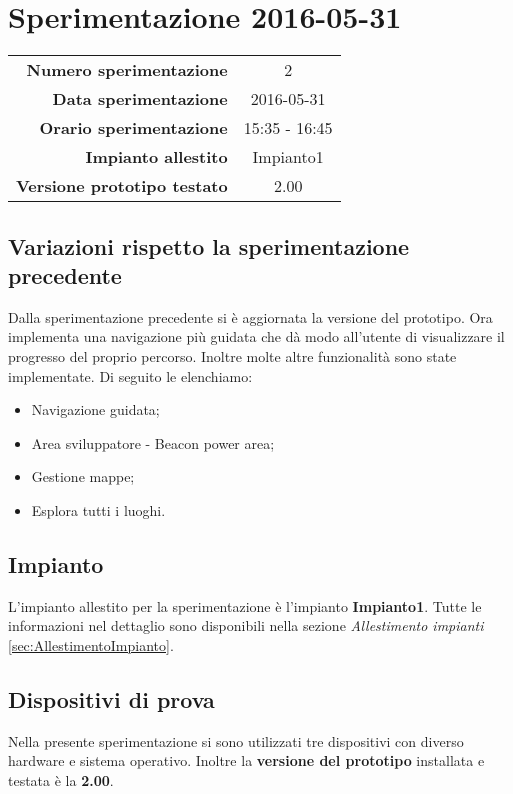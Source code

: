 \documentclass[../Sperimentazione.tex]{subfiles}
\begin{document}
	\section{Sperimentazione 2016-05-31}
	
		\begin{table} [h]
		\centering
		\begin{tabular}[width=0.5\textwidth]{r|c}
			\textbf{Numero sperimentazione} & 2 \\
			\textbf{Data sperimentazione} & 2016-05-31 \\
			\textbf{Orario sperimentazione} & 15:35 - 16:45 \\
			\textbf{Impianto allestito} & Impianto1 \\
			\textbf{Versione prototipo testato} & 2.00 \\		
		\end{tabular}
		\end{table}
		
		\subsection{Variazioni rispetto la sperimentazione precedente}
			Dalla sperimentazione precedente si è aggiornata la versione del prototipo. Ora implementa una navigazione più guidata che dà modo all'utente di visualizzare il progresso del proprio percorso. Inoltre molte altre funzionalità sono state implementate. Di seguito le elenchiamo:
			\begin{itemize}
				\item Navigazione guidata;
				\item Area sviluppatore - Beacon power area;
				\item Gestione mappe;
				\item Esplora tutti i luoghi.
			\end{itemize}
		
		\subsection{Impianto}
		L'impianto allestito per la sperimentazione è l'impianto \textbf{Impianto1}. Tutte le informazioni nel dettaglio sono disponibili nella sezione \textit{Allestimento impianti} \ref{sec:AllestimentoImpianto}.


		\subsection{Dispositivi di prova}
			Nella presente sperimentazione si sono utilizzati tre dispositivi con diverso hardware e sistema operativo. Inoltre la \textbf{versione del prototipo} installata e testata è la \textbf{2.00}.
	
\end{document}
